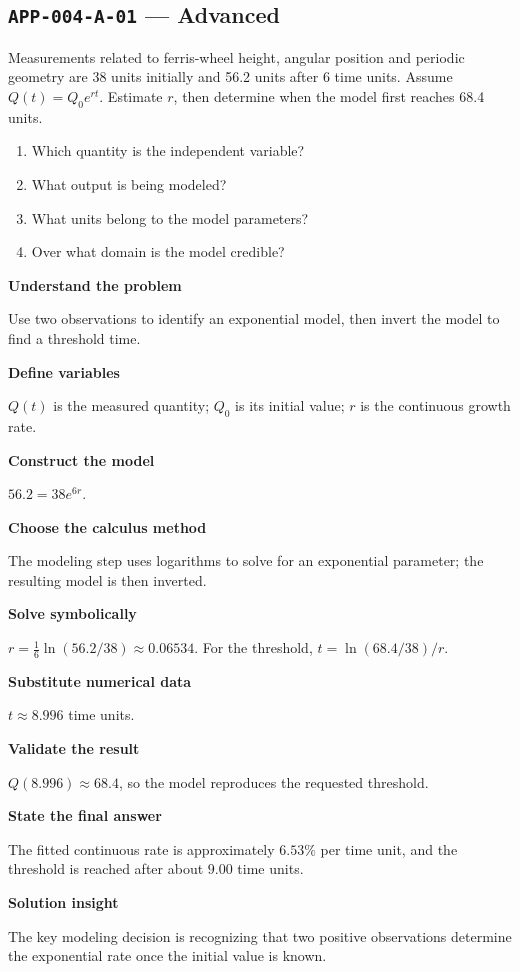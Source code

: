 \documentclass[11pt]{book}
\newcommand{\pid}[1]{\texttt{#1}}
\begin{document}
\subsection*{\pid{APP-004-A-01} — Advanced}
\begin{problembox}
Measurements related to ferris-wheel height, angular position and periodic geometry are 38 units initially and 56.2 units after 6 time units. Assume $Q(t)=Q_0e^{rt}$. Estimate $r$, then determine when the model first reaches 68.4 units.
\end{problembox}
\begin{promptbox}\begin{enumerate}
\item Which quantity is the independent variable?
\item What output is being modeled?
\item What units belong to the model parameters?
\item Over what domain is the model credible?
\end{enumerate}\end{promptbox}
\begin{solutionbox}
\textbf{Understand the problem}\par Use two observations to identify an exponential model, then invert the model to find a threshold time.\par\medskip
\textbf{Define variables}\par $Q(t)$ is the measured quantity; $Q_0$ is its initial value; $r$ is the continuous growth rate.\par\medskip
\textbf{Construct the model}\par $56.2=38e^{6r}$.\par\medskip
\textbf{Choose the calculus method}\par The modeling step uses logarithms to solve for an exponential parameter; the resulting model is then inverted.\par\medskip
\textbf{Solve symbolically}\par $r=\frac1{6}\ln(56.2/38)\approx 0.06534$. For the threshold, $t=\ln(68.4/38)/r$.\par\medskip
\textbf{Substitute numerical data}\par $t\approx 8.996$ time units.\par\medskip
\textbf{Validate the result}\par $Q(8.996)\approx 68.4$, so the model reproduces the requested threshold.\par\medskip
\textbf{State the final answer}\par The fitted continuous rate is approximately $6.53\%$ per time unit, and the threshold is reached after about $9.00$ time units.\par\medskip
\textbf{Solution insight}\par The key modeling decision is recognizing that two positive observations determine the exponential rate once the initial value is known.\par\medskip
\end{solutionbox}
\end{document}
